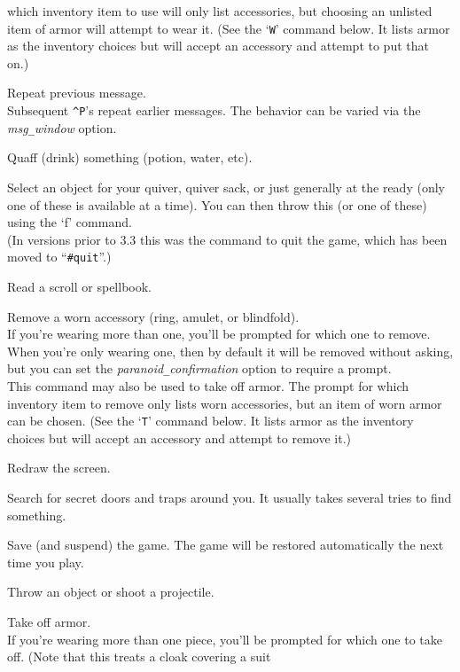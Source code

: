 which inventory item to use will only list accessories, but choosing
an unlisted item of armor will attempt to wear it.
(See the `{\tt W}' command below.  It lists armor as the inventory
choices but will accept an accessory and attempt to put that on.)
\item[\tb{\^{}P}]
Repeat previous message.\\
Subsequent {\tt \^{}P}'s repeat earlier messages.
The behavior can be varied via the {\it msg\verb+_+window\/} option.
\item[\tb{q}]
Quaff (drink) something (potion, water, etc).
\item[\tb{Q}]
Select an object for your quiver, quiver sack, or just generally at
the ready (only one of these is available at a time).  You can then throw
this (or one of these) using
the `f' command.\\
(In versions prior to 3.3 this was the command to quit
the game, which has been moved to ``{\tt \#quit}''.)
\item[\tb{r}]
Read a scroll or spellbook.
\item[\tb{R}]
Remove a worn accessory (ring, amulet, or blindfold).\\
If you're wearing more than one, you'll be prompted for which one to
remove.  When you're only wearing one, then by default it will be removed
without asking, but you can set the
{\it paranoid\verb+_+confirmation\/}
option to require a prompt.\\
This command may also be used to take off armor.  The prompt for which
inventory item to remove only lists worn accessories, but an item of
worn armor can be chosen.
(See the `{\tt T}' command below.  It lists armor as the inventory
choices but will accept an accessory and attempt to remove it.)
\item[\tb{\^{}R}]
Redraw the screen.
\item[\tb{s}]
Search for secret doors and traps around you.  It usually takes several
tries to find something.
\item[\tb{S}]
Save (and suspend) the game.  The game will be restored automatically the
next time you play.
\item[\tb{t}]
Throw an object or shoot a projectile.
\item[\tb{T}]
Take off armor.\\
If you're wearing more than one piece, you'll be prompted for which
one to take off.  (Note that this treats a cloak covering a suit
